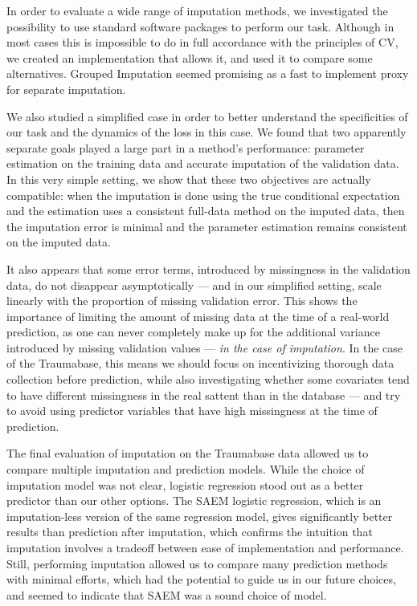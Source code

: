 \documentclass[12pt, a4paper]{memoir}
\begin{document}
In order to evaluate a wide range of imputation methods, we investigated the possibility to use standard software packages to perform our task. Although in most cases this is impossible to do in full accordance with the principles of CV, we created an implementation that allows it, and used it to compare some alternatives. Grouped Imputation seemed promising as a fast to implement proxy for separate imputation.

We also studied a simplified case in order to better understand the specificities of our task and the dynamics of the loss in this case. We found that two apparently separate goals played a large part in a method's performance: parameter estimation on the training data and accurate imputation of the validation data. In this very simple setting, we show that these two objectives are actually compatible: when the imputation is done using the true conditional expectation and the estimation uses a consistent full-data method on the imputed data, then the imputation error is minimal and the parameter estimation remains consistent on the imputed data. 

It also appears that some error terms, introduced by missingness in the validation data, do not disappear asymptotically --- and in our simplified setting, scale linearly with the proportion of missing validation error. This shows the importance of limiting the amount of missing data at the time of a real-world prediction, as one can never completely make up for the additional variance introduced by missing validation values --- \emph{in the case of imputation}. In the case of the Traumabase, this means we should focus on incentivizing thorough data collection before prediction, while also investigating whether some covariates tend to have different missingness in the real sattent than in the database --- and try to avoid using predictor variables that have high missingness at the time of prediction.

The final evaluation of imputation on the Traumabase data allowed us to compare multiple imputation and prediction models. While the choice of imputation model was not clear, logistic regression stood out as a better predictor than our other options. The SAEM logistic regression, which is an imputation-less version of the same regression model, gives significantly better results than prediction after imputation, which confirms the intuition that imputation involves a tradeoff between ease of implementation and performance. Still, performing imputation allowed us to compare many prediction methods with minimal efforts, which had the potential to guide us in our future choices, and seemed to indicate that SAEM was a sound choice of model.
\end{document}
